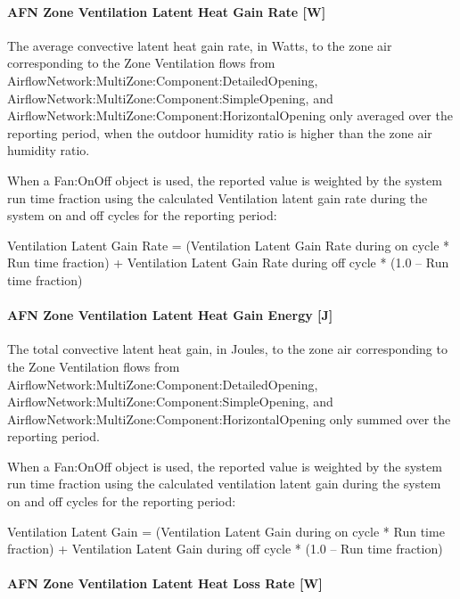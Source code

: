 \paragraph{AFN Zone Ventilation Latent Heat Gain Rate {[}W{]}}\label{afn-zone-ventilation-latent-heat-gain-rate-w}

The average convective latent heat gain rate, in Watts, to the zone air corresponding to the Zone Ventilation flows from AirflowNetwork:MultiZone:Component:DetailedOpening, AirflowNetwork:MultiZone:Component:SimpleOpening, and AirflowNetwork:MultiZone:Component:HorizontalOpening only averaged over the reporting period, when the outdoor humidity ratio is higher than the zone air humidity ratio.

When a Fan:OnOff object is used, the reported value is weighted by the system run time fraction using the calculated Ventilation latent gain rate during the system on and off cycles for the reporting period:

Ventilation Latent Gain Rate = (Ventilation Latent Gain Rate during on cycle * Run time fraction) + Ventilation Latent Gain Rate during off cycle * (1.0 -- Run time fraction)

\paragraph{AFN Zone Ventilation Latent Heat Gain Energy {[}J{]}}\label{afn-zone-ventilation-latent-heat-gain-energy-j}

The total convective latent heat gain, in Joules, to the zone air corresponding to the Zone Ventilation flows from AirflowNetwork:MultiZone:Component:DetailedOpening, AirflowNetwork:MultiZone:Component:SimpleOpening, and AirflowNetwork:MultiZone:Component:HorizontalOpening only  summed over the reporting period.

When a Fan:OnOff object is used, the reported value is weighted by the system run time fraction using the calculated ventilation latent gain during the system on and off cycles for the reporting period:

Ventilation Latent Gain = (Ventilation Latent Gain during on cycle * Run time fraction) + Ventilation Latent Gain during off cycle * (1.0 -- Run time fraction)

\paragraph{AFN Zone Ventilation Latent Heat Loss Rate {[}W{]}}\label{afn-zone-ventilation-latent-heat-loss-rate-w}

